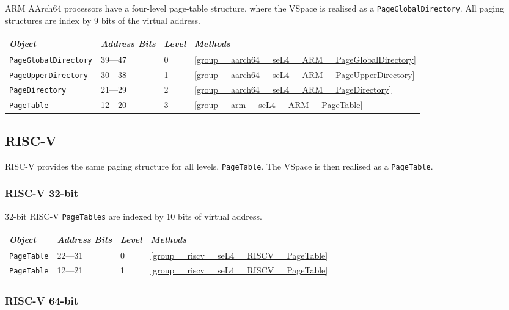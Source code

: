 ARM AArch64 processors have a four-level page-table structure, where the VSpace is realised as a
\texttt{PageGlobalDirectory}. All paging structures are index by 9 bits of the virtual address.

\begin{tabularx}{\textwidth}{Xlll} \toprule
\emph{Object}                    & \emph{Address Bits} & \emph{Level} & \emph{Methods} \\ \midrule
    \texttt{PageGlobalDirectory} & 39---47             & 0            & \autoref{group__aarch64__seL4__ARM__PageGlobalDirectory} \\
    \texttt{PageUpperDirectory}  & 30---38             & 1            & \autoref{group__aarch64__seL4__ARM__PageUpperDirectory} \\
\texttt{PageDirectory}           & 21---29             & 2            & \autoref{group__aarch64__seL4__ARM__PageDirectory} \\
\texttt{PageTable}               & 12---20             & 3            & \autoref{group__arm__seL4__ARM__PageTable} \\
\bottomrule
\end{tabularx}

\subsection{RISC-V}

RISC-V provides the same paging structure for all levels, \texttt{PageTable}. The VSpace is then
realised as a \texttt{PageTable}.

\subsubsection{RISC-V 32-bit}

32-bit RISC-V \texttt{PageTables} are indexed by 10 bits of virtual address.

\begin{tabularx}{\textwidth}{Xlll} \toprule
\emph{Object}          & \emph{Address Bits} & \emph{Level} & \emph{Methods} \\ \midrule
\texttt{PageTable}     & 22---31             & 0            & \autoref{group__riscv__seL4__RISCV__PageTable} \\
\texttt{PageTable}     & 12---21             & 1            & \autoref{group__riscv__seL4__RISCV__PageTable} \\
\bottomrule
\end{tabularx}

\subsubsection{RISC-V 64-bit}

